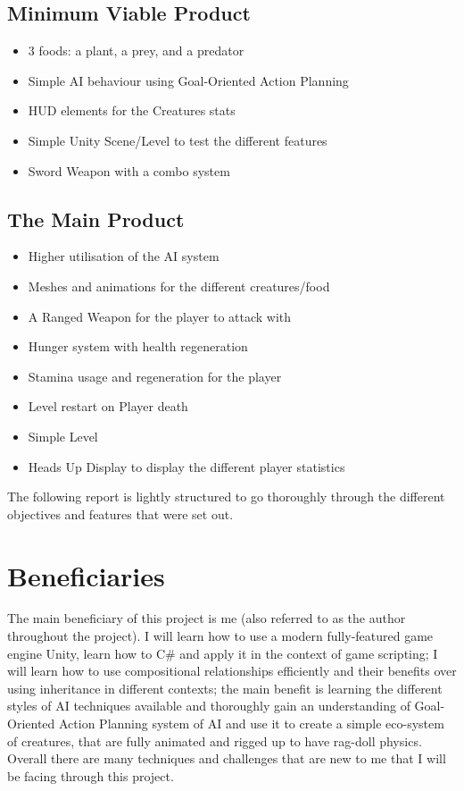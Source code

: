 \documentclass[11pt]{report}
\begin{document}
\subsection{Minimum Viable Product}
\begin{itemize}
    \item 3 foods: a plant, a prey, and a predator
    \item Simple AI behaviour using Goal-Oriented Action Planning
    \item HUD elements for the Creatures stats
    \item Simple Unity Scene/Level to test the different features
    \item Sword Weapon with a combo system
\end{itemize}
\subsection{The Main Product}
\begin{itemize}
    \item Higher utilisation of the AI system
    \item Meshes and animations for the different creatures/food
    \item A Ranged Weapon for the player to attack with
    \item Hunger system with health regeneration
    \item Stamina usage and regeneration for the player
    \item Level restart on Player death
    \item Simple Level
    \item Heads Up Display to display the different player statistics
\end{itemize}
The following report is lightly structured to go thoroughly through the different objectives and features that were set out.


\section{Beneficiaries}
The main beneficiary of this project is me (also referred to as the author throughout the project). I will learn how to use a modern fully-featured game engine Unity, learn how to C\# and apply it in the context of game scripting; I will learn how to use compositional relationships efficiently and their benefits over using inheritance in different contexts; the main benefit is learning the different styles of AI techniques available and thoroughly gain an understanding of Goal-Oriented Action Planning system of AI and use it to create a simple eco-system of creatures, that are fully animated and rigged up to have rag-doll physics. Overall there are many techniques and challenges that are new to me that I will be facing through this project. 
\end{document}
